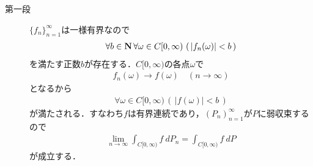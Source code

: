	\begin{sketch}\mbox{}
		\begin{description}
			\item[第一段]
				$\{f_n\}_{n=1}^\infty$は一様有界なので
				\begin{align}
					\forall b \in \mathbf{N}\, \forall \omega \in C[0,\infty)\,
					\left(\, |f_n(\omega)| < b\, \right)
				\end{align}
				を満たす正数$b$が存在する．$C[0,\infty)$の各点$\omega$で
				\begin{align}
					f_n(\omega) \longrightarrow f(\omega)\quad (n \longrightarrow \infty)
				\end{align}
				となるから
				\begin{align}
					\forall \omega \in C[0,\infty)\, (\, |f(\omega)| < b\, )
				\end{align}
				が満たされる．すなわち$f$は有界連続であり，$(P_n)_{n=1}^\infty$が$P$に弱収束するので
				\begin{align}
					\lim_{n \to \infty} \int_{C[0,\infty)} f\ dP_n
					= \int_{C[0,\infty)} f\ dP
				\end{align}
				が成立する．
				

\end{description}
\end{sketch}
